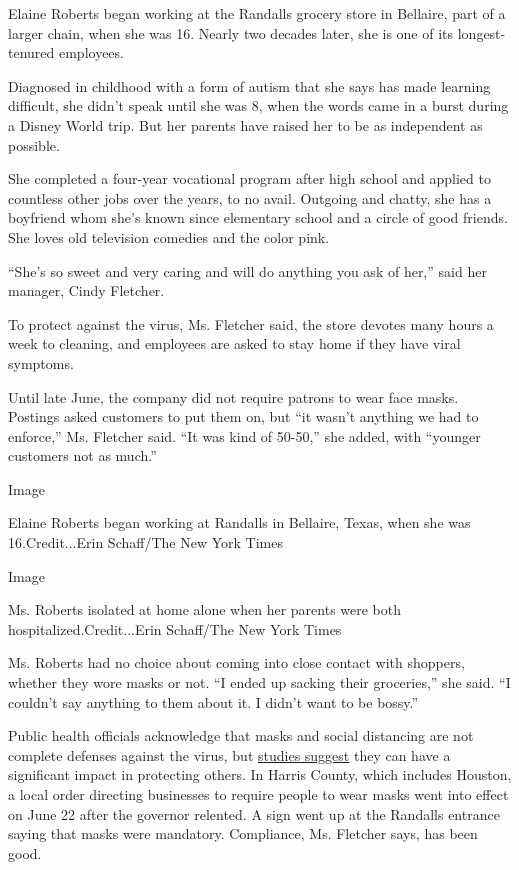 Elaine Roberts began working at the Randalls grocery store in Bellaire,
part of a larger chain, when she was 16. Nearly two decades later, she
is one of its longest-tenured employees.

Diagnosed in childhood with a form of autism that she says has made
learning difficult, she didn't speak until she was 8, when the words
came in a burst during a Disney World trip. But her parents have raised
her to be as independent as possible.

She completed a four-year vocational program after high school and
applied to countless other jobs over the years, to no avail. Outgoing
and chatty, she has a boyfriend whom she's known since elementary school
and a circle of good friends. She loves old television comedies and the
color pink.

``She's so sweet and very caring and will do anything you ask of her,''
said her manager, Cindy Fletcher.

To protect against the virus, Ms. Fletcher said, the store devotes many
hours a week to cleaning, and employees are asked to stay home if they
have viral symptoms.

Until late June, the company did not require patrons to wear face masks.
Postings asked customers to put them on, but ``it wasn't anything we had
to enforce,'' Ms. Fletcher said. ``It was kind of 50-50,'' she added,
with ``younger customers not as much.''

Image

Elaine Roberts began working at Randalls in Bellaire, Texas, when she
was 16.Credit...Erin Schaff/The New York Times

Image

Ms. Roberts isolated at home alone when her parents were both
hospitalized.Credit...Erin Schaff/The New York Times

Ms. Roberts had no choice about coming into close contact with shoppers,
whether they wore masks or not. ``I ended up sacking their groceries,''
she said. ``I couldn't say anything to them about it. I didn't want to
be bossy.''

Public health officials acknowledge that masks and social distancing are
not complete defenses against the virus, but
\href{https://www.ucsf.edu/news/2020/06/417906/still-confused-about-masks-heres-science-behind-how-face-masks-prevent}{studies
suggest} they can have a significant impact in protecting others. In
Harris County, which includes Houston, a local order directing
businesses to require people to wear masks went into effect on June 22
after the governor relented. A sign went up at the Randalls entrance
saying that masks were mandatory. Compliance, Ms. Fletcher says, has
been good.

